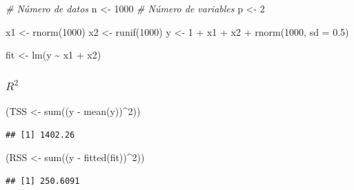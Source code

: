 \documentclass[
  12pt,
]{book}
\newenvironment{Shaded}{\begin{snugshade}}{\end{snugshade}}
\newcommand{\AttributeTok}[1]{\textcolor[rgb]{0.77,0.63,0.00}{#1}}
\newcommand{\CommentTok}[1]{\textcolor[rgb]{0.56,0.35,0.01}{\textit{#1}}}
\newcommand{\DecValTok}[1]{\textcolor[rgb]{0.00,0.00,0.81}{#1}}
\newcommand{\FloatTok}[1]{\textcolor[rgb]{0.00,0.00,0.81}{#1}}
\newcommand{\FunctionTok}[1]{\textcolor[rgb]{0.00,0.00,0.00}{#1}}
\newcommand{\NormalTok}[1]{#1}
\newcommand{\OtherTok}[1]{\textcolor[rgb]{0.56,0.35,0.01}{#1}}
\newcommand{\SpecialCharTok}[1]{\textcolor[rgb]{0.00,0.00,0.00}{#1}}
\theoremstyle{definition}
\theoremstyle{definition}
\theoremstyle{definition}
\theoremstyle{remark}
\begin{document}
\begin{Shaded}
\begin{Highlighting}[]
\CommentTok{\# Número de datos}
\NormalTok{n }\OtherTok{\textless{}{-}} \DecValTok{1000}
\CommentTok{\# Número de variables}
\NormalTok{p }\OtherTok{\textless{}{-}} \DecValTok{2}

\NormalTok{x1 }\OtherTok{\textless{}{-}} \FunctionTok{rnorm}\NormalTok{(}\DecValTok{1000}\NormalTok{)}
\NormalTok{x2 }\OtherTok{\textless{}{-}} \FunctionTok{runif}\NormalTok{(}\DecValTok{1000}\NormalTok{)}
\NormalTok{y }\OtherTok{\textless{}{-}} \DecValTok{1} \SpecialCharTok{+}\NormalTok{ x1 }\SpecialCharTok{+}\NormalTok{ x2 }\SpecialCharTok{+} \FunctionTok{rnorm}\NormalTok{(}\DecValTok{1000}\NormalTok{, }\AttributeTok{sd =} \FloatTok{0.5}\NormalTok{)}

\NormalTok{fit }\OtherTok{\textless{}{-}} \FunctionTok{lm}\NormalTok{(y }\SpecialCharTok{\textasciitilde{}}\NormalTok{ x1 }\SpecialCharTok{+}\NormalTok{ x2)}
\end{Highlighting}
\end{Shaded}

\hypertarget{r2}{%
\subsubsection{\texorpdfstring{\(R^2\)}{R\^{}2}}\label{r2}}

\begin{Shaded}
\begin{Highlighting}[]
\NormalTok{(TSS }\OtherTok{\textless{}{-}} \FunctionTok{sum}\NormalTok{((y }\SpecialCharTok{{-}} \FunctionTok{mean}\NormalTok{(y))}\SpecialCharTok{\^{}}\DecValTok{2}\NormalTok{))}
\end{Highlighting}
\end{Shaded}

\begin{verbatim}
## [1] 1402.26
\end{verbatim}

\begin{Shaded}
\begin{Highlighting}[]
\NormalTok{(RSS }\OtherTok{\textless{}{-}} \FunctionTok{sum}\NormalTok{((y }\SpecialCharTok{{-}} \FunctionTok{fitted}\NormalTok{(fit))}\SpecialCharTok{\^{}}\DecValTok{2}\NormalTok{))}
\end{Highlighting}
\end{Shaded}

\begin{verbatim}
## [1] 250.6091
\end{verbatim}
\end{document}
